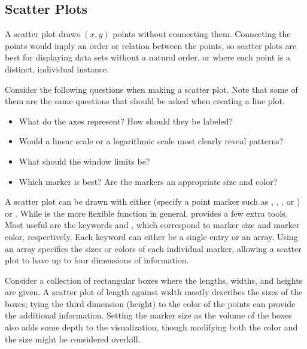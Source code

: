 \subsection*{Scatter Plots} %

A scatter plot draws $(x,y)$ points without connecting them.
Connecting the points would imply an order or relation between the points, so scatter plots are best for displaying data sets without a natural order, or where each point is a distinct, individual instance.

Consider the following questions when making a scatter plot.
Note that some of them are the same questions that should be asked when creating a line plot.
%
\begin{itemize}
    \item What do the axes represent? How should they be labeled?
    \item Would a linear scale or a logarithmic scale most clearly reveal patterns?
    \item What should the window limits be?
    \item Which marker is best? Are the markers an appropriate size and color?
\end{itemize}

A scatter plot can be drawn with either  (specify a point marker such as , , , or ) or .
While  is the more flexible function in general,  provides a few extra tools.
Most useful are the keywords  and , which correspond to marker size and marker color, respectively.
Each keyword can either be a single entry or an array.
Using an array specifies the sizes or colors of each individual marker, allowing a scatter plot to have up to four dimensions of information.

Consider a collection of rectangular boxes where the lengths, widths, and heights are given.
A scatter plot of length against width mostly describes the sizes of the boxes; tying the third dimension (height) to the color of the points can provide the additional information.
Setting the marker size as the volume of the boxes also adds some depth to the visualization, though modifying both the color and the size might be considered overkill.

